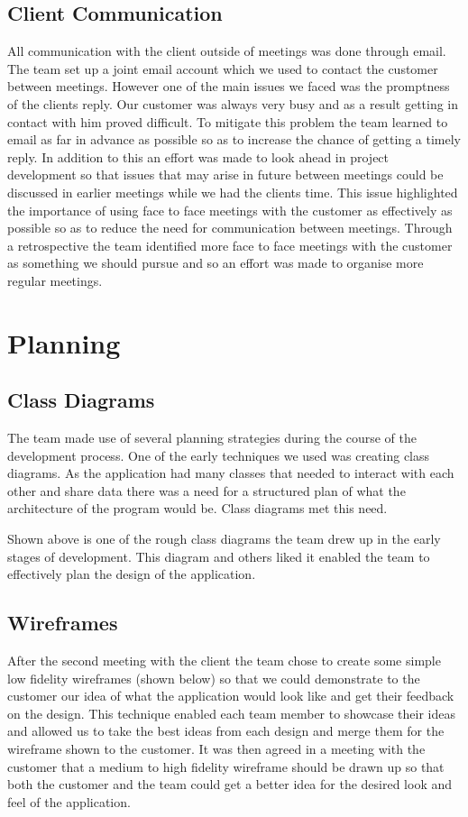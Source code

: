 \documentclass{l3proj}
\begin{document}
\subsection{Client Communication}
All communication with the client outside of meetings was done through email. The team set up a joint email account which we used to contact the customer between meetings. However one of the main issues we faced was the promptness of the clients reply. Our customer was always very busy and as a result getting in contact with him proved difficult. To mitigate this problem the team learned to email as far in advance as possible so as to increase the chance of getting a timely reply. In addition to this an effort was made to look ahead in project development so that issues that may arise in future between meetings could be discussed in earlier meetings while we had the clients time. This issue highlighted the importance of using face to face meetings with the customer as effectively as possible so as to reduce the need for communication between meetings. Through a retrospective the team identified more face to face meetings with the customer as something we should pursue and so an effort was made to organise more regular meetings.
\section{Planning}
\label{sec:planning}

\subsection{Class Diagrams}
The team made use of several planning strategies during the course of the development process. One of the early techniques we used was creating class diagrams. As the application had many classes that needed to interact with each other and share data there was a need for a structured plan of what the architecture of the program would be. Class diagrams met this need.

Shown above is one of the rough class diagrams the team drew up in the early stages of development. This diagram and others liked it enabled the team to effectively plan the design of the application.

\subsection{Wireframes}
After the second meeting with the client the team chose to create some simple low fidelity wireframes (shown below) so that we could demonstrate to the customer our idea of what the application would look like and get their feedback on the design. This technique enabled each team member to showcase their ideas and allowed us to take the best ideas from each design and merge them for the wireframe shown to the customer. It was then agreed in a meeting with the customer that a medium to high fidelity wireframe should be drawn up so that both the customer and the team could get a better idea for the desired look and feel of the application.
\end{document}
